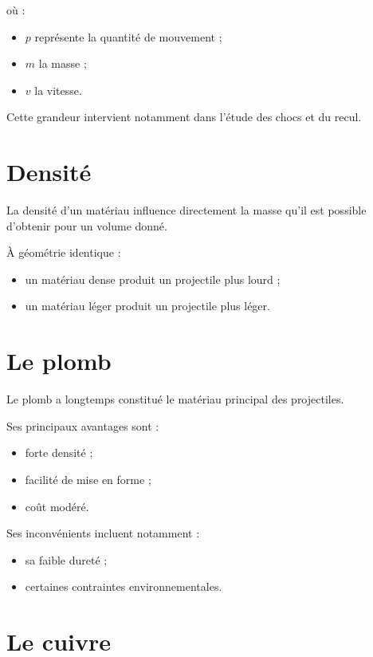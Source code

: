 où :

\begin{itemize}
    \item $p$ représente la quantité de mouvement ;
    \item $m$ la masse ;
    \item $v$ la vitesse.
\end{itemize}

Cette grandeur intervient notamment dans l'étude des chocs et du recul.

\section{Densité}

La densité d'un matériau influence directement la masse qu'il est possible
d'obtenir pour un volume donné.

À géométrie identique :

\begin{itemize}
    \item un matériau dense produit un projectile plus lourd ;
    \item un matériau léger produit un projectile plus léger.
\end{itemize}

\section{Le plomb}

Le plomb a longtemps constitué le matériau principal des projectiles.

Ses principaux avantages sont :

\begin{itemize}
    \item forte densité ;
    \item facilité de mise en forme ;
    \item coût modéré.
\end{itemize}

Ses inconvénients incluent notamment :

\begin{itemize}
    \item sa faible dureté ;
    \item certaines contraintes environnementales.
\end{itemize}

\section{Le cuivre}

